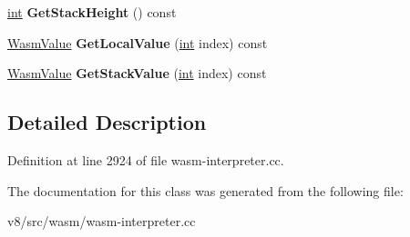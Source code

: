 \begin{DoxyCompactItemize}
\mbox{\hyperlink{classint}{int}} {\bfseries Get\+Stack\+Height} () const
\item 
\mbox{\label{classv8_1_1internal_1_1wasm_1_1InterpretedFrameImpl_ac48d1902d06e326380fb8082fc4306d7}} 
\mbox{\hyperlink{classv8_1_1internal_1_1wasm_1_1WasmValue}{Wasm\+Value}} {\bfseries Get\+Local\+Value} (\mbox{\hyperlink{classint}{int}} index) const
\item 
\mbox{\label{classv8_1_1internal_1_1wasm_1_1InterpretedFrameImpl_a51ee3f76606fe24f840199a1b28d181a}} 
\mbox{\hyperlink{classv8_1_1internal_1_1wasm_1_1WasmValue}{Wasm\+Value}} {\bfseries Get\+Stack\+Value} (\mbox{\hyperlink{classint}{int}} index) const
\end{DoxyCompactItemize}


\subsection{Detailed Description}


Definition at line 2924 of file wasm-\/interpreter.\+cc.



The documentation for this class was generated from the following file\+:\begin{DoxyCompactItemize}
\item 
v8/src/wasm/wasm-\/interpreter.\+cc\end{DoxyCompactItemize}
